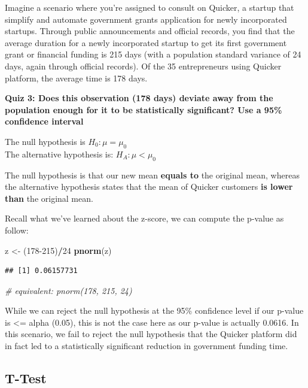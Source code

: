 \documentclass[]{article}
\newenvironment{Shaded}{\begin{snugshade}}{\end{snugshade}}
\newcommand{\CommentTok}[1]{\textcolor[rgb]{0.56,0.35,0.01}{\textit{#1}}}
\newcommand{\DecValTok}[1]{\textcolor[rgb]{0.00,0.00,0.81}{#1}}
\newcommand{\KeywordTok}[1]{\textcolor[rgb]{0.13,0.29,0.53}{\textbf{#1}}}
\newcommand{\NormalTok}[1]{#1}
\newcommand{\OperatorTok}[1]{\textcolor[rgb]{0.81,0.36,0.00}{\textbf{#1}}}
\newcommand{\StringTok}[1]{\textcolor[rgb]{0.31,0.60,0.02}{#1}}
\begin{document}
Imagine a scenario where you're assigned to consult on Quicker, a
startup that simplify and automate government grants application for
newly incorporated startups. Through public announcements and official
records, you find that the average duration for a newly incorporated
startup to get its first government grant or financial funding is 215
days (with a population standard variance of 24 days, again through
official records). Of the 35 entrepreneurs using Quicker platform, the
average time is 178 days.

\textbf{Quiz 3: Does this observation (178 days) deviate away from the
population enough for it to be statistically significant? Use a 95\%
confidence interval}

The null hypothesis is \(H_0: \mu = \mu_0\)\\
The alternative hypothesis is: \(H_A: \mu < \mu_0\)

The null hypothesis is that our new mean \textbf{equals to} the original
mean, whereas the alternative hypothesis states that the mean of Quicker
customers \textbf{is lower than} the original mean.

Recall what we've learned about the z-score, we can compute the p-value
as follow:

\begin{Shaded}
\begin{Highlighting}[]
\NormalTok{z <-}\StringTok{ }\NormalTok{(}\DecValTok{178-215}\NormalTok{)}\OperatorTok{/}\DecValTok{24}
\KeywordTok{pnorm}\NormalTok{(z)}
\end{Highlighting}
\end{Shaded}

\begin{verbatim}
## [1] 0.06157731
\end{verbatim}

\begin{Shaded}
\begin{Highlighting}[]
\CommentTok{# equivalent: pnorm(178, 215, 24)}
\end{Highlighting}
\end{Shaded}

While we can reject the null hypothesis at the 95\% confidence level if
our p-value is \textless{}= alpha (0.05), this is not the case here as
our p-value is actually 0.0616. In this scenario, we fail to reject the
null hypothesis that the Quicker platform did in fact led to a
statistically significant reduction in government funding time.

\hypertarget{t-test}{%
\subsection{T-Test}\label{t-test}}
\end{document}
